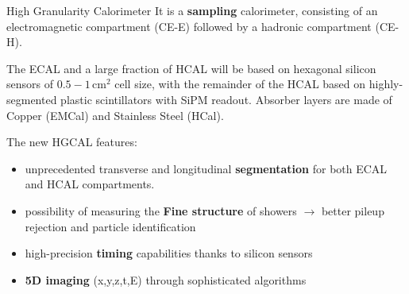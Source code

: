 \documentclass[10pt]{beamer}
\begin{document}
\begin{frame}{High Granularity Calorimeter}
    It is a \textbf{sampling} calorimeter, consisting of an electromagnetic compartment (CE-E) followed by a hadronic compartment (CE-H).
    
    The ECAL and a large fraction of HCAL will be based on hexagonal silicon sensors of $0.5 - 1\,\text{cm}^2$ cell size, with the remainder of the HCAL based on highly-segmented plastic scintillators with SiPM readout.
    Absorber layers are made of Copper (EMCal) and Stainless Steel (HCal).

    The new HGCAL features:
    \begin{itemize}
        \item unprecedented transverse and longitudinal \textbf{segmentation} for both ECAL and HCAL compartments. 
        \item possibility of measuring the \textbf{Fine structure} of showers $\rightarrow$ better pileup rejection and particle identification
        \item high-precision \textbf{timing} capabilities thanks to silicon sensors
        \item \textbf{5D imaging} (x,y,z,t,E) through sophisticated algorithms 
    \end{itemize}{}
\end{frame}

%        
\end{document}
